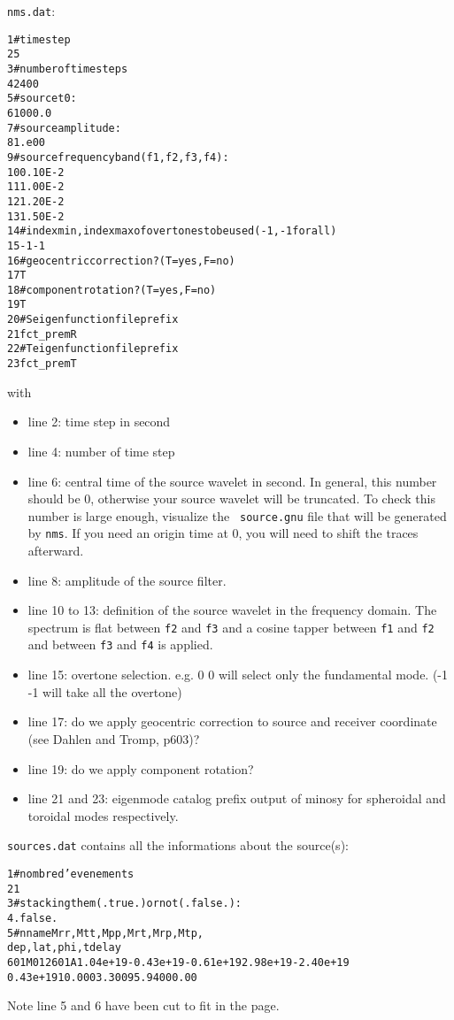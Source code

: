 \documentclass[11pt]{article}
\begin{document}
{\tt nms.dat}:
\begin{alltt}
\small
 1 #time step
 2 5
 3 #number of time steps
 4 2400
 5 #source t0:
 6 1000.0
 7 #source amplitude:
 8 1.e00
 9 #source frequency band (f1,f2,f3,f4):
10 0.10E-2
11 1.00E-2
12 1.20E-2
13 1.50E-2
14 #index min, index max of overtones to be used (-1,-1 for all)
15 -1 -1
16 #geocentric correction? (T=yes, F=no)
17 T
18 #component rotation? (T=yes, F=no)
19 T
20 #S eigenfunction file prefix
21 fct_premR
22 #T eigenfunction file prefix
23 fct_premT
\end{alltt}	
with 
\begin{itemize}	
\item line 2: time step in second
\item line 4: number of time step
\item line 6: central time of the source wavelet in second. In
general, this number should be 0, otherwise your source wavelet will
be truncated. To check this number is large enough, visualize the {\tt
source.gnu} file that will be generated by {\tt nms}. If you need an
origin time at 0, you will need to shift the traces afterward.
\item line 8: amplitude of the source filter.
\item line 10 to 13: definition of the source wavelet in the 
frequency domain. The spectrum is flat between {\tt f2} and {\tt f3}
and a cosine tapper between {\tt f1} and {\tt f2} and  between {\tt f3}
and {\tt f4} is applied.
\item line 15: overtone selection. e.g. 0 0 will select only the
fundamental mode. (-1 -1 will take all the overtone)
\item line 17: do we apply geocentric correction to source and receiver
coordinate (see Dahlen and Tromp, p603)?
\item line 19:  do we apply component rotation?
\item line 21 and 23: eigenmode catalog prefix output of minosy for
spheroidal and toroidal modes respectively.
\end{itemize}	
{\tt \large sources.dat} contains all the informations about the source(s):
\begin{alltt}
\small
1 #nombre d'evenements
2 1
3 # stacking them (.true.) or not (.false.):
4 .false.
5 #n name      Mrr,     Mtt,       Mpp,     Mrt,      Mrp,       Mtp,
dep,   lat,   phi, tdelay 
6 01 M012601A  1.04e+19 -0.43e+19 -0.61e+19  2.98e+19 -2.40e+19
    0.43e+19  10.00  03.30 095.94 000.00 
\end{alltt}	
Note line 5 and 6 have been cut to fit in the page.
\end{document}
